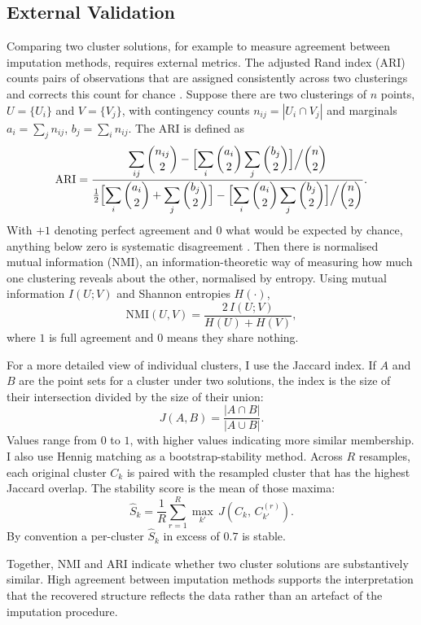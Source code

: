 \subsection{External Validation}

Comparing two cluster solutions, for example to measure agreement between imputation methods, requires external metrics. The adjusted Rand index (ARI) counts pairs of observations that are assigned consistently across two clusterings and corrects this count for chance \parencite{hubert1985comparing}. Suppose there are two clusterings of $n$ points, $U=\{U_i\}$ and $V=\{V_j\}$, with contingency counts $n_{ij}=|U_i\cap V_j|$ and marginals $a_i=\sum_j n_{ij}$, $b_j=\sum_i n_{ij}$. The ARI is defined as
\begin{equation}\label{eq:ari}
\mathrm{ARI}=\frac{\displaystyle\sum_{ij}\binom{n_{ij}}{2}-\Bigl[\sum_i\binom{a_i}{2}\sum_j\binom{b_j}{2}\Bigr]\Big/\binom{n}{2}}{\displaystyle\tfrac12\Bigl[\sum_i\binom{a_i}{2}+\sum_j\binom{b_j}{2}\Bigr]-\Bigl[\sum_i\binom{a_i}{2}\sum_j\binom{b_j}{2}\Bigr]\Big/\binom{n}{2}}.
\end{equation}
With $+1$ denoting perfect agreement and $0$ what would be expected by chance, anything below zero is systematic disagreement \parencite{robert2020comparing}. Then there is normalised mutual information (NMI), an information-theoretic way of measuring how much one clustering reveals about the other, normalised by entropy. Using mutual information $I(U;V)$ and Shannon entropies $H(\cdot)$,
\begin{equation}\label{eq:nmi}
\mathrm{NMI}(U,V)=\frac{2\,I(U;V)}{H(U)+H(V)},
\end{equation}
where $1$ is full agreement and $0$ means they share nothing.

For a more detailed view of individual clusters, I use the Jaccard index. If $A$ and $B$ are the point sets for a cluster under two solutions, the index is the size of their intersection divided by the size of their union:
\begin{equation}\label{eq:jaccard}
J(A,B)=\frac{|A\cap B|}{|A\cup B|}.
\end{equation}
Values range from $0$ to $1$, with higher values indicating more similar membership. I also use Hennig matching \parencite{hennig2007cluster} as a bootstrap-stability method. Across $R$ resamples, each original cluster $C_k$ is paired with the resampled cluster that has the highest Jaccard overlap. The stability score is the mean of those maxima:
\begin{equation}\label{eq:hennig}
\hat{S}_k=\frac{1}{R}\sum_{r=1}^{R}\max_{k'}\,J\!\left(C_k,\,C_{k'}^{(r)}\right).
\end{equation}
By convention a per-cluster $\hat{S}_k$ in excess of $0.7$ is stable.

Together, NMI and ARI indicate whether two cluster solutions are substantively similar. High agreement between imputation methods supports the interpretation that the recovered structure reflects the data rather than an artefact of the imputation procedure.

